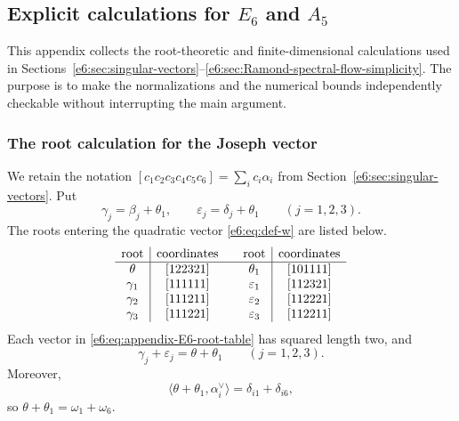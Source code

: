 \documentclass[11pt,reqno]{amsart}
\theoremstyle{definition}
\theoremstyle{remark}
\begin{document}
\subsection{Explicit calculations for \texorpdfstring{$E_6$}{E6} and \texorpdfstring{$A_5$}{A5}}
\label{e6:app:explicit-calculations}

This appendix collects the root-theoretic and finite-dimensional calculations
used in Sections~\ref{e6:sec:singular-vectors}--\ref{e6:sec:Ramond-spectral-flow-simplicity}.
The purpose is to make the normalizations and the numerical bounds independently
checkable without interrupting the main argument.

\subsubsection{The root calculation for the Joseph vector}
\label{e6:app:Joseph-root-calculation}

We retain the notation
\(
[c_1c_2c_3c_4c_5c_6]=\sum_i c_i\alpha_i
\)
from Section~\ref{e6:sec:singular-vectors}.  Put
\[
  \gamma_j=\beta_j+\theta_1,
  \qquad
  \varepsilon_j=\delta_j+\theta_1
  \qquad (j=1,2,3).
\]
The roots entering the quadratic vector \eqref{e6:eq:def-w} are listed below.
\begin{equation}\label{e6:eq:appendix-E6-root-table}
\begin{array}{c|c@{\qquad}c|c}
\text{root}&\text{coordinates}&\text{root}&\text{coordinates}\\ \hline
\theta &[122321]&\theta_1 &[101111]\\
\gamma_1 &[111111]&\varepsilon_1 &[112321]\\
\gamma_2 &[111211]&\varepsilon_2 &[112221]\\
\gamma_3 &[111221]&\varepsilon_3 &[112211]
\end{array}
\end{equation}
Each vector in \eqref{e6:eq:appendix-E6-root-table} has squared length two, and
\[
  \gamma_j+\varepsilon_j=\theta+\theta_1
  \qquad (j=1,2,3).
\]
Moreover,
\begin{equation}\label{e6:eq:appendix-weight-pairings}
  \bigl\langle\theta+\theta_1,\alpha_i^\vee\bigr\rangle
  =\delta_{i1}+\delta_{i6},
\end{equation}
so \(\theta+\theta_1=\omega_1+\omega_6\).
\end{document}
